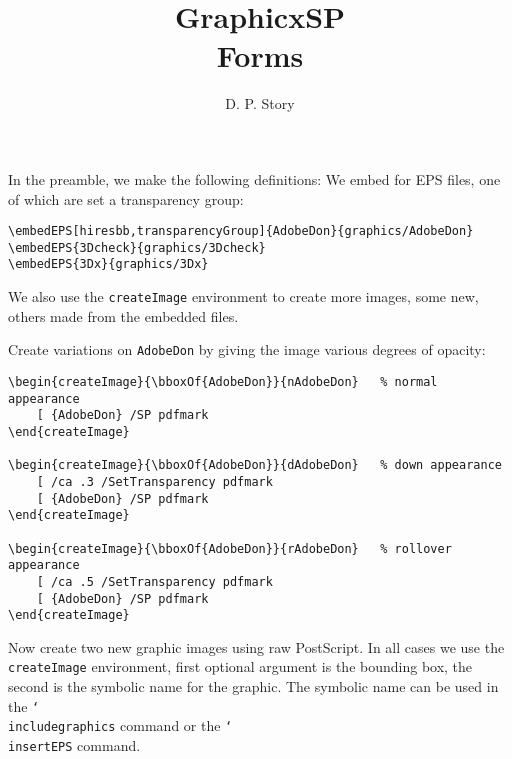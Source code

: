 \documentclass{article}
\title{\textsf{GraphicxSP}\texorpdfstring{\\}{:} Forms}
\author{D. P. Story}
\newcommand{\cs}[1]{\texttt{\char`\\#1}}
\begin{document}
\maketitle

In the preamble, we make the following definitions: We embed for EPS
files, one of which are set a transparency group:
{\small\begin{verbatim}
\embedEPS[hiresbb,transparencyGroup]{AdobeDon}{graphics/AdobeDon}
\embedEPS{3Dcheck}{graphics/3Dcheck}
\embedEPS{3Dx}{graphics/3Dx}
\end{verbatim}
}
We also use the \texttt{createImage} environment to create more images, some new, others made
from the embedded files.\medskip

Create variations on \texttt{AdobeDon} by giving the image various degrees of opacity:
\begin{scriptsize}
\begin{verbatim}
\begin{createImage}{\bboxOf{AdobeDon}}{nAdobeDon}   % normal appearance
    [ {AdobeDon} /SP pdfmark
\end{createImage}

\begin{createImage}{\bboxOf{AdobeDon}}{dAdobeDon}   % down appearance
    [ /ca .3 /SetTransparency pdfmark
    [ {AdobeDon} /SP pdfmark
\end{createImage}

\begin{createImage}{\bboxOf{AdobeDon}}{rAdobeDon}   % rollover appearance
    [ /ca .5 /SetTransparency pdfmark
    [ {AdobeDon} /SP pdfmark
\end{createImage}
\end{verbatim}
\end{scriptsize}


\newpage

Now create two new graphic images using raw PostScript. In all cases we use
the \texttt{createImage} environment, first optional argument is the bounding box,
the second is the symbolic name for the graphic. The symbolic name can be used
in the \cs{includegraphics} command or the \cs{insertEPS} command.
\end{document}

